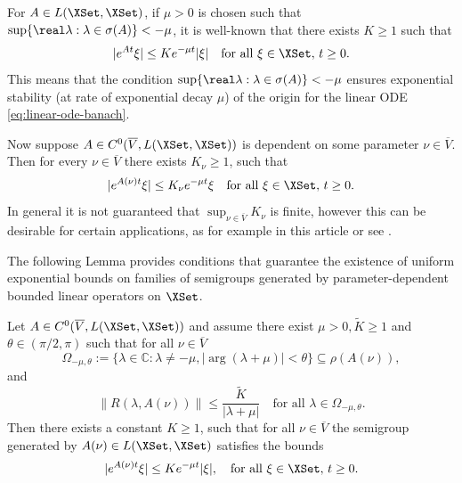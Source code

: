 \documentclass[a4paper]{siamart190516}
\begin{document}
For $A \in L(\XSet,\XSet)$, if $\mu > 0$ is chosen such that $\sup \{ \real \lambda : \lambda \in \sigma(A) \} < -\mu$, it is well-known that there exists $K \geq 1$ such that
\[
| e^{At} \xi | \leq K e^{-\mu t} |\xi| \quad \text{for all } \xi \in \XSet, \, t \geq 0.
\]
This means that the condition $\sup \{ \real \lambda : \lambda \in \sigma(A) \} < -\mu$ ensures exponential stability (at rate of exponential decay $\mu$) of the origin for the linear ODE \cref{eq:linear-ode-banach}. 

Now suppose $A \in C^0(\overline{V},L(\XSet,\XSet))$ is dependent on some parameter $\nu \in \overline{V}$. Then for every $\nu \in \overline{V}$ there exists $K_{\nu} \geq 1$, such that
\[
| e^{A(\nu)t} \xi | \leq K_\nu e^{-\mu t} \xi \quad \text{for all } \xi \in \XSet, \, t \geq 0.
\]
In general it is not guaranteed that $\sup_{\nu \in \overline{V}} K_{\nu}$ is finite, however this can be desirable for certain applications, as for example in this article or see \cite{LaPo24}.

The following Lemma provides conditions that guarantee the existence of uniform exponential bounds on families of semigroups generated by parameter-dependent bounded linear operators on $\XSet$. 
 
 \begin{lemma}\label{lem:un-sec-un-bounds}
Let $A \in C^0(\overline{V},L(\XSet,\XSet))$ and assume there exist $\mu >0, \tilde{K} \geq 1$ and $\theta \in (\pi/2,\pi)$ such that for all $\nu \in \overline{V}$
 \[
\Omega_{-\mu, \theta} := \{ \lambda \in \mathbb{C}: \lambda \neq -\mu, |\arg(\lambda + \mu)| < \theta \} \subseteq  \rho(A(\nu)),
 \]
 and
 \[
\| R(\lambda, A(\nu)) \| \leq \frac{\tilde{K}}{|\lambda + \mu|} \quad \text{for all } \lambda \in \Omega_{-\mu, \theta}.
\]
 Then there exists a constant $K \geq 1$, such that for all $\nu \in \overline{V}$ the semigroup generated by $A(\nu) \in L(\XSet,\XSet)$ satisfies the bounds
 \[
 | e^{A(\nu)t} \xi | \leq K e^{-\mu t} |\xi|, \quad \text{for all } \xi \in \XSet, \, t \geq 0.
 \]
 \end{lemma}
 
\end{document}
